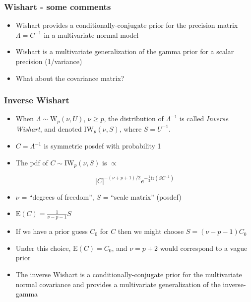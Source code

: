 \documentclass[handout]{beamer}
\begin{document}

\begin{frame}
\frametitle{Wishart - some comments}
\begin{itemize}[<+-| alert@+>]
\item Wishart provides a conditionally-conjugate prior for the precision matrix $\Lambda = C^{-1}$
in a multivariate normal model

\item Wishart is a multivariate generalization of the gamma prior for a scalar precision (1/variance)

\item What about the covariance matrix?
\end{itemize}
\end{frame}

\begin{frame}
\frametitle{Inverse Wishart}
\begin{itemize}[<+-| alert@+>]
\item When $\Lambda \sim \mbox{W}_p(\nu,U)$, $\nu\geq p$, the distribution of $\Lambda^{-1}$ is called {\em Inverse Wishart}, and denoted $\mbox{IW}_p(\nu,S)$, where $S=U^{-1}$.
\item $C=\Lambda^{-1}$ is symmetric posdef with probability 1
\item The pdf of $C \sim \mbox{IW}_p( \nu, S)$ is $\propto$

    $$|C|^{-(\nu+p+1)/2} e^{ -\frac{1}{2}\mbox{tr}( S C^{-1}) }$$

\item $\nu$ = ``degrees of freedom'', $S$ = ``scale matrix'' (posdef)

\item $\mbox{E}(C) = \frac{1}{\nu-p-1} S$

\item If we have a prior guess $C_0$ for $C$ then we might choose $S=(\nu-p-1)C_0$
\item Under this choice, $\mbox{E}( C ) = C_0$, and $\nu = p+2$ would correspond to a vague prior

\item The inverse Wishart is a conditionally-conjugate prior for the multivariate normal covariance and provides
a multivariate generalization of the inverse-gamma
\end{itemize}
\end{frame}
\end{document}
